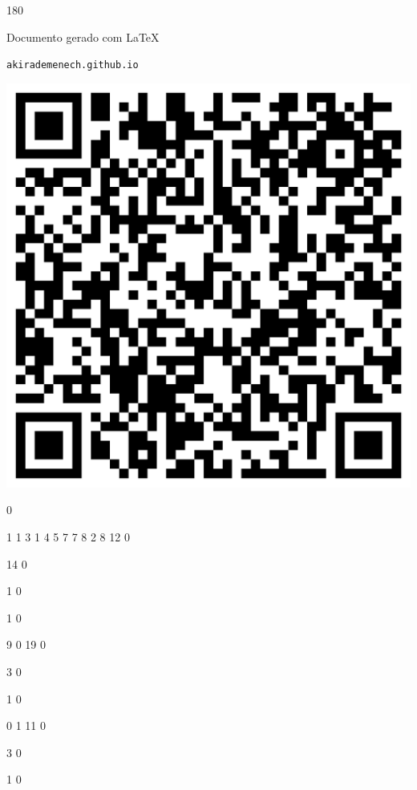 \documentclass[12pt]{article}
\begin{document}
	\begin{turn}{180}	
		\begin{minipage}{\textwidth}		  
		  Documento gerado com \LaTeX			
		  
		  \texttt{akirademenech.github.io}

		  \includegraphics[height=0.3\textheight]{2e-2.pdf}

		\end{minipage}	
	\end{turn}  
		  
		\vfill  
		  
{
	0	%

	1	%
	1	%
	3	%
	1	%
	4	%
	5	%
	7	%
	7	%
	8	%
	2	%
	8	%
	12	%
	0	%

	14	%
	0	%

	1	%
	0	%

	1	%
	0	%

	9	%
	0	%
	19	%
	0	%

	3	%
	0	%

	1	%
	0	%

	0	%
	1	%
	11	%
	0	%

	3	%
	0	%

	1	%
	0	%

}	  
		    	
\end{document}
